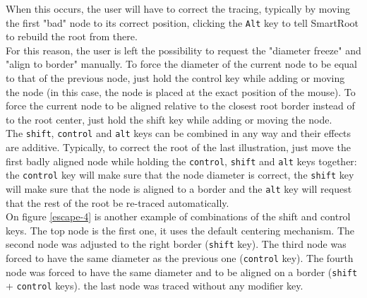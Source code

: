 \documentclass[a4paper,english,10pt]{report}
\begin{document}
When this occurs, the user will have to correct the tracing, typically by moving the first "bad" node to its correct position, clicking the \verb|Alt| key to tell SmartRoot to rebuild the root from there.\\

For this reason, the user is left the possibility to request the "diameter freeze" and "align to border" manually. To force the diameter of the current node to be equal to that of the previous node, just hold the control key while adding or moving the node (in this case, the node is placed at the exact position of the mouse). To force the current node to be aligned relative to the closest root border instead of to the root center, just hold the shift key while adding or moving the node.\\

The \verb|shift|, \verb|control| and \verb|alt| keys can be combined in any way and their effects are additive. Typically, to correct the root of the last illustration, just move the first badly aligned node while holding the \verb|control|, \verb|shift| and \verb|alt| keys together: the \verb|control| key will make sure that the node diameter is correct, the \verb|shift| key will make sure that the node is aligned to a border and the \verb|alt| key will request that the rest of the root be re-traced automatically.\\

On figure \ref{escape-4} is another example of combinations of the shift and control keys. The top node is the first one, it uses the default centering mechanism. The second node was adjusted to the right border (\verb|shift| key). The third node was forced to have the same diameter as the previous one (\verb|control| key). The fourth node was forced to have the same diameter and to be aligned on a border (\verb|shift| + \verb|control| keys). the last node was traced without any modifier key.

\end{document}

